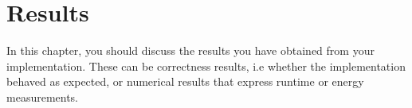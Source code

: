 \chapter{Results}
In this chapter, you should discuss the results you have obtained from your implementation.
These can be correctness results, i.e whether the implementation behaved as expected, or numerical results that express runtime or energy measurements.